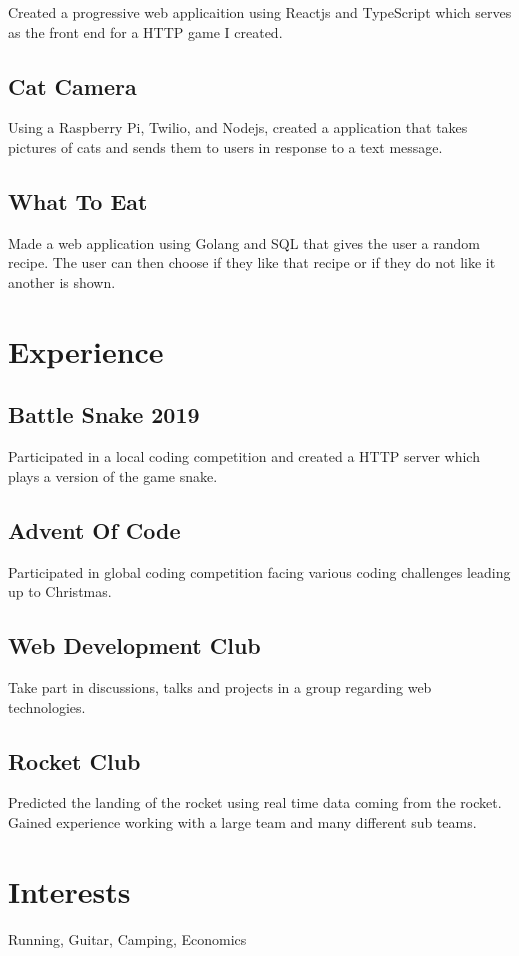 \documentclass{article}
\newcommand{\hrefColored}[3]{\href{#2}{\color{#1}{#3}}}
\begin{document}
Created a progressive web applicaition using Reactjs and TypeScript which serves
as the front end for a HTTP game I created.

\subsection{Cat Camera \hrefColored{blue}{https://github.com/McRaeAlex/prettykitty}{github.com/McRaeAlex/prettykitty}}

Using a Raspberry Pi, Twilio, and Nodejs, created a application that takes 
pictures of cats and sends them to users in response to a text message.

\subsection{What To Eat \hrefColored{blue}{https://github.com/McRaeAlex/WhatToEat}{github.com/McRaeAlex/WhatToEat}}

Made a web application using Golang and SQL that gives the user a random recipe.
The user can then choose if they like that recipe or if they do not like it 
another is shown.

\section{Experience}

\subsection{Battle Snake 2019 \hrefColored{blue}{https://github.com/McRaeAlex/BattleSnake2019}{github.com/McRaeAlex/BattleSnake2019}}

Participated in a local coding competition and created a HTTP server which plays
a version of the game snake.

\subsection{Advent Of Code \hrefColored{blue}{https://github.com/McRaeAlex/AdventOfCode2018}{github.com/McRaeAlex/AdventOfCode2018}}

Participated in global coding competition facing various coding challenges
leading up to Christmas.

\subsection{Web Development Club}

Take part in discussions, talks and projects in a group regarding web 
technologies.

\subsection{Rocket Club}

Predicted the landing of the rocket using real time data coming from the rocket. 
Gained experience working with a large team and many different sub teams.

\section{Interests}
Running, Guitar, Camping, Economics
\end{document}
